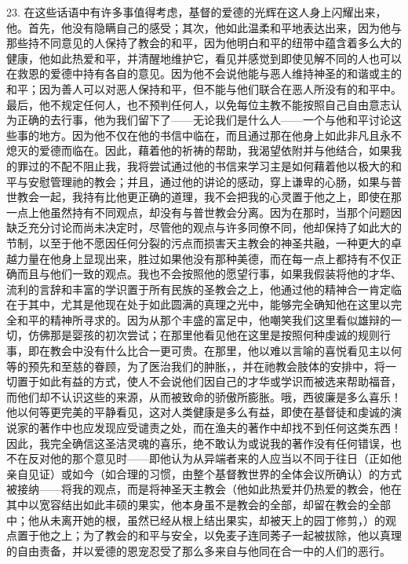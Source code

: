 23. 在这些话语中有许多事值得考虑，基督的爱德的光辉在这人身上闪耀出来，他。首先，他没有隐瞒自己的感受；其次，他如此温柔和平地表达出来，因为他与那些持不同意见的人保持了教会的和平，因为他明白和平的纽带中蕴含着多么大的健康，他如此热爱和平，并清醒地维护它，看见并感觉到即使见解不同的人也可以在救恩的爱德中持有各自的意见。因为他不会说他能与恶人维持神圣的和谐或主的和平；因为善人可以对恶人保持和平，但不能与他们联合在恶人所没有的和平中。最后，他不规定任何人，也不预判任何人，以免每位主教不能按照自己自由意志认为正确的去行事，他为我们留下了——无论我们是什么人——一个与他和平讨论这些事的地方。因为他不仅在他的书信中临在，而且通过那在他身上如此非凡且永不熄灭的爱德而临在。因此，藉着他的祈祷的帮助，我渴望依附并与他结合，如果我的罪过的不配不阻止我，我将尝试通过他的书信来学习主是如何藉着他以极大的和平与安慰管理祂的教会；并且，通过他的讲论的感动，穿上谦卑的心肠，如果与普世教会一起，我持有比他更正确的道理，我不会把我的心灵置于他之上，即使在那一点上他虽然持有不同观点，却没有与普世教会分离。因为在那时，当那个问题因缺乏充分讨论而尚未决定时，尽管他的观点与许多同僚不同，他却保持了如此大的节制，以至于他不愿因任何分裂的污点而损害天主教会的神圣共融，一种更大的卓越力量在他身上显现出来，胜过如果他没有那种美德，而在每一点上都持有不仅正确而且与他们一致的观点。我也不会按照他的愿望行事，如果我假装将他的才华、流利的言辞和丰富的学识置于所有民族的圣教会之上，他通过他的精神合一肯定临在于其中，尤其是他现在处于如此圆满的真理之光中，能够完全确知他在这里以完全和平的精神所寻求的。因为从那个丰盛的富足中，他嘲笑我们这里看似雄辩的一切，仿佛那是婴孩的初次尝试；在那里他看见他在这里是按照何种虔诚的规则行事，即在教会中没有什么比合一更可贵。在那里，他以难以言喻的喜悦看见主以何等的预先和至慈的眷顾，为了医治我们的肿胀，，并在祂教会肢体的安排中，将一切置于如此有益的方式，使人不会说他们因自己的才华或学识而被选来帮助福音，而他们却不认识这些的来源，从而被致命的骄傲所膨胀。哦，西彼廉是多么喜乐！他以何等更完美的平静看见，这对人类健康是多么有益，即使在基督徒和虔诚的演说家的著作中也应发现应受谴责之处，而在渔夫的著作中却找不到任何这类东西！因此，我完全确信这圣洁灵魂的喜乐，绝不敢认为或说我的著作没有任何错误，也不在反对他的那个意见时——即他认为从异端者来的人应当以不同于往日（正如他亲自见证）或如今（如合理的习惯，由整个基督教世界的全体会议所确认）的方式被接纳——将我的观点，而是将神圣天主教会（他如此热爱并仍热爱的教会，他在其中以宽容结出如此丰硕的果实，他本身虽不是教会的全部，却留在教会的全部中；他从未离开她的根，虽然已经从根上结出果实，却被天上的园丁修剪，）的观点置于他之上；为了教会的和平与安全，以免麦子连同莠子一起被拔除，他以真理的自由责备，并以爱德的恩宠忍受了那么多来自与他同在合一中的人们的恶行。\par

